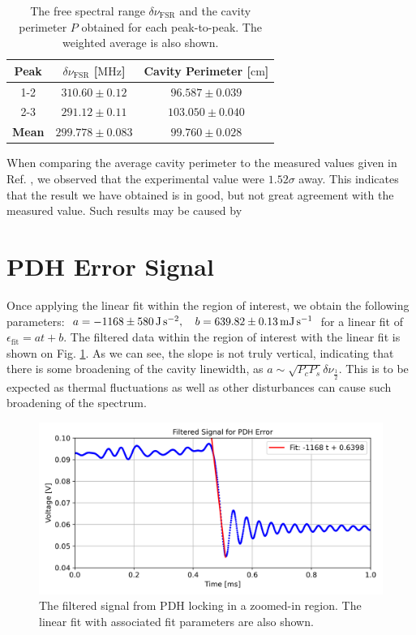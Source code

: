 \documentclass[a4paper]{report}
\numberwithin{equation}{section}
\begin{document}
\begin{table}[h!]
	\centering
	\begin{tabular}{|c|c|c|}
		\hline 
		Peak & $\delta\nu_{\mathrm{FSR}}$ [$\si{\mega\hertz}$] & Cavity Perimeter [$\si{\centi\meter}$]\\ \hline
		1-2 & $310.60 \pm 0.12$ & $96.587 \pm 0.039$ \\ \hline
		2-3 & $291.12 \pm 0.11$ & $103.050 \pm 0.040$ \\ \hline
		\textbf{Mean} & \textbf{$299.778 \pm 0.083$} & \textbf{$99.760 \pm 0.028$} \\ \hline
	\end{tabular}
	\caption{The free spectral range $\delta\nu_{\mathrm{FSR}}$ and the cavity perimeter $P$ obtained for each
			peak-to-peak. The weighted average is also shown.}
	\label{tab:fsr_peri}
\end{table}

When comparing the average cavity perimeter to the measured values given in Ref. \cite{Groh2021},
we observed that the experimental value were $1.52\sigma$ away. This indicates that the 
result we have obtained is in good, but not great agreement with the measured value. Such results may be caused by \par 

\section{PDH Error Signal}

Once applying the linear fit within the region of interest, we obtain 
the following parameters: $a = \SI{-1168 \pm 580}{\joule\per\second\squared}, \quad b = \SI{639.82 \pm 0.13}{\milli\joule\per\second}$
for a linear fit of $\epsilon_{\mathrm{fit}} = a t + b$. The filtered data within the region of interest
 with the linear fit is shown on Fig. \ref{fig:pdh_err_filt_fit}. As we can see, the slope is not truly vertical, indicating that there is some broadening of the 
 cavity linewidth, as $a \sim \sqrt{P_c P_s} \delta\nu_{\frac{1}{2}}$. 
 This is to be expected as thermal fluctuations as well as other disturbances can cause such broadening of the spectrum.  

 \begin{figure}[h!]
	\centering
	\includegraphics[width=0.8\columnwidth]{pdh_err_filt_fit.png}
	\caption{The filtered signal from PDH locking in a zoomed-in region. The linear fit with associated fit parameters are 
	also shown.}
	\label{fig:pdh_err_filt_fit}
\end{figure}
\end{document}
